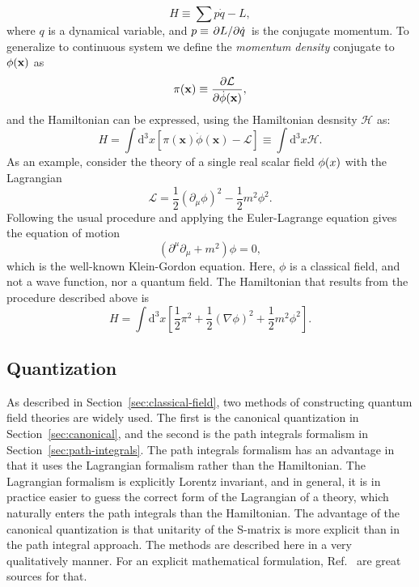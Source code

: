 \begin{equation}
H \equiv \sum p\dot{q} - L,
\end{equation}
where $q$ is a dynamical variable, and $p\equiv \pdv*{L}{\dot{q}}$ is the conjugate momentum. To generalize to continuous system we define the \emph{momentum density} conjugate to $\phi\qty(\vb{x})$ as
\begin{equation}
\pi\qty(\vb{x})\equiv\pdv{\mathcal{L}}{\dot{\phi}\qty(\vb{x})},
\end{equation}
and the Hamiltonian can be expressed, using the Hamiltonian desnsity $\mathcal{H}$ as:
\begin{equation}
H = \int \mathrm{d}^3x [\pi(\mathbf{x})\dot{\phi}(\mathbf{x}) - \mathcal{L}] \equiv \int \mathrm{d}^3x \mathcal{H} .
\end{equation}
As an example, consider the theory of a single real scalar field $\phi\qty(x)$ with the Lagrangian
\begin{equation}
\mathcal{L} = \frac{1}{2}\left( \partial_\mu \phi \right)^2-\frac{1}{2}m^2\phi^2.
\label{eq:kg-lagrangian}
\end{equation}
Following the usual procedure and applying the Euler-Lagrange equation gives the equation of motion
\begin{equation}
\left(\partial^\mu\partial_\mu + m^2\right)\phi=0,
\end{equation}
which is the well-known Klein-Gordon equation. Here, $\phi$ is a classical field, and not a wave function, nor a quantum field. The Hamiltonian that results from the procedure described above is
\begin{equation}
H = \int \mathrm{d}^3x\left[ \frac{1}{2}\pi^2 + \frac{1}{2}\left( \nabla\phi \right)^2 + \frac{1}{2}m^2\phi^2  \right].
\end{equation}

\subsection{Quantization}
\label{sec:quantization}

As described in Section~\ref{sec:classical-field}, two methods of constructing quantum field theories are widely used. The first is the canonical quantization in Section~\ref{sec:canonical}, and the second is the path integrals formalism in Section~\ref{sec:path-integrals}. The path integrals formalism has an advantage in that it uses the Lagrangian formalism rather than the Hamiltonian. The Lagrangian formalism is explicitly Lorentz invariant, and in general, it is in practice easier to guess the correct form of the Lagrangian of a theory, which naturally enters the path integrals than the Hamiltonian. The advantage of the canonical quantization is that unitarity of the S-matrix is more explicit than in the path integral approach. The methods are described here in a very qualitatively manner. For an explicit mathematical formulation, Ref.~\cite{Peskin2019-bt,Srednicki2007-mn} are great sources for that.

